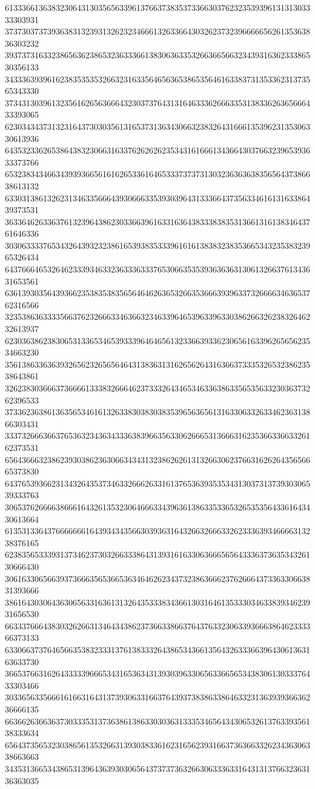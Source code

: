 61333661363832306431303565633961376637383537336630376232353939613131303333303931
37373037373936383132393132623234666132633664303262373239666665626135363836303232
39373731633238656362386532363336613830636335326636656632343931636233386530356133
34333639396162383535353266323163356465636538653564616338373135336231373565343330
37343130396132356162656366643230373764313164633362666335313833626365666433393065
62303434373132316437303035613165373136343066323832643166613539623135306330613936
64353233626538643832306631633762626262353431616661343664303766323965393633373766
65323834346634393936656161626533616465333737373130323636363835656437386638613132
63303138613262313463356664393066633539303964313336643735633461613163386439373531
36336462633637613239643862303366396163316364383338383531366131613834643761646336
30306333376534326439323238616539383533396161613838323835366534323538323965326434
64376664653264623339346332363336333765306635353936363631306132663761343631653561
63613930356439366235383538356564646263653266353666393963373266663463653762316566
32353863633335663762326663346366323463396465396339633038626632623832646232613937
62303638623830653133653465393339646465613233663933623065616339626565623534663230
35613863363639326562326565646431383631316265626431636637333532653238623538643861
32623830366637366661333832666462373332643465346336386335653563323036373262396533
37336236386136356534616132633830383038353965636561316330633263346236313866303431
33373266636637653632343634333638396635633062666531366631623536633663326162373531
65643666323862393038623630663434313238626261313266306237663162626435656665373830
64376539366231343264353734633266626331613765363935353431303731373930306539333763
30653762666638666164326135323064666334396361386335336532653535643361643430613664
61353133643766666661643934343566303936316432663266633262333639346666313238376165
62383565333931373462373032663338643139316163306366656564333637363534326130666430
30616330656639373666356536653634646262343732386366623762666437336330663831393666
38616430306436306563316361313264353338343661303164613533303463383934623931656530
66333766643830326266313464343862373663386637643763323063393666386462333366373133
63306637376465663538323331376138333264386534366135643263336639643061363163633730
36653766316264333339666534316536343139303963306563366565343830613033376433303466
30336563356661616631643137393063316637643937383863386463323136393936636236666135
66366263663637303335313736386138633030363133353465643430653261376339356138333634
65643735653230386561353266313930383361623165623931663736366332623436306338663663
34353136653438653139643639303065643737373632663063336331643131376632363136363035
